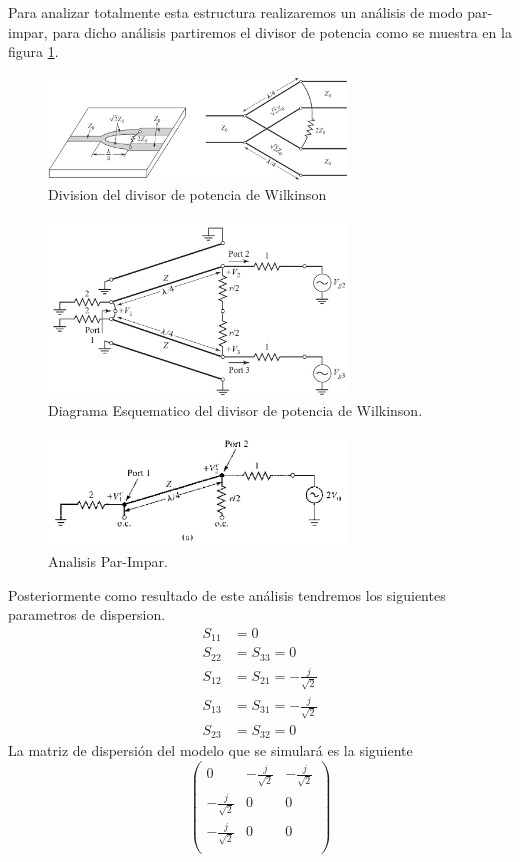 \documentclass[a4paper]{IEEEtran} %
\begin{document}
Para analizar totalmente esta estructura realizaremos un análisis de modo par-impar, para dicho análisis partiremos el divisor de potencia como se muestra en la figura \ref{fig:Analisis}.
\vspace{50mm}
\begin{figure}[h]
    \centering
        \includegraphics[width=8cm]{imagenes/img17}
        \caption{Division del divisor de potencia de Wilkinson}
        \label{fig:Analisis}
\end{figure}
\begin{figure}[h]
    \centering
    \includegraphics[width=8cm]{imagenes/img3}
    \caption{Diagrama Esquematico del divisor de potencia de Wilkinson.}
    \label{fig:diagrama}
\end{figure}
\begin{figure}[h]    
    \centering
        \includegraphics[width=8cm]{imagenes/img4}
        \caption{Analisis Par-Impar.}
        \label{fig:analisis-par-impar}
\end{figure}
Posteriormente como resultado de este análisis tendremos los siguientes parametros de dispersion. 
\begin{equation}
\begin{split}
    S_{11}&=0 \\
    S_{22}&=S_{33}=0 \\
    S_{12}&=S_{21}=-\frac{j}{\sqrt{2}}\\
    S_{13}&=S_{31}=-\frac{j}{\sqrt{2}}\\
    S_{23}&=S_{32}=0
\end{split}
    \label{eq:parametros}
\end{equation}
La matriz de dispersión del modelo que se simulará es la siguiente
\begin{equation}
    \begin{pmatrix}
    0&-\frac{j}{\sqrt{2}}&-\frac{j}{\sqrt{2}}\\
    -\frac{j}{\sqrt{2}}&0&0\\
    -\frac{j}{\sqrt{2}}&0&0\\
    \end{pmatrix}
    \label{eq:matrix_numbers}
\end{equation}
\end{document}
